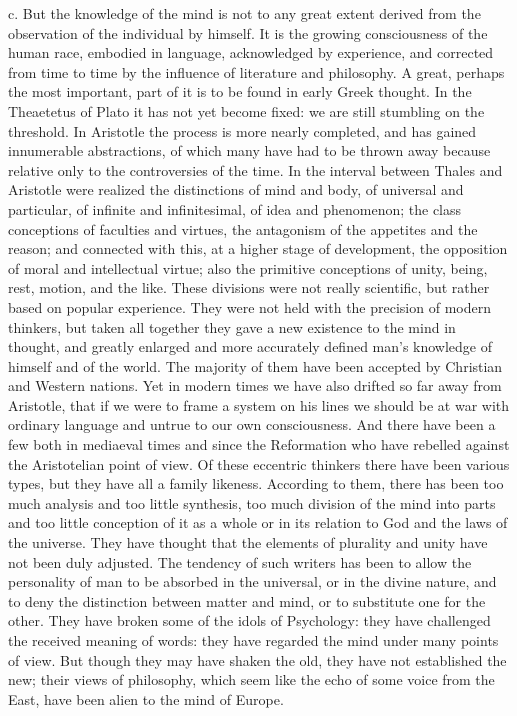 c. But the knowledge of the mind is not to any great extent derived
from the observation of the individual by himself. It is the growing
consciousness of the human race, embodied in language, acknowledged
by experience, and corrected from time to time by the influence of
literature and philosophy. A great, perhaps the most important, part of
it is to be found in early Greek thought. In the Theaetetus of Plato it
has not yet become fixed: we are still stumbling on the threshold.
In Aristotle the process is more nearly completed, and has gained
innumerable abstractions, of which many have had to be thrown away
because relative only to the controversies of the time. In the interval
between Thales and Aristotle were realized the distinctions of mind and
body, of universal and particular, of infinite and infinitesimal, of
idea and phenomenon; the class conceptions of faculties and virtues, the
antagonism of the appetites and the reason; and connected with this, at
a higher stage of development, the opposition of moral and intellectual
virtue; also the primitive conceptions of unity, being, rest, motion,
and the like. These divisions were not really scientific, but rather
based on popular experience. They were not held with the precision of
modern thinkers, but taken all together they gave a new existence to the
mind in thought, and greatly enlarged and more accurately defined man's
knowledge of himself and of the world. The majority of them have been
accepted by Christian and Western nations. Yet in modern times we have
also drifted so far away from Aristotle, that if we were to frame a
system on his lines we should be at war with ordinary language and
untrue to our own consciousness. And there have been a few both in
mediaeval times and since the Reformation who have rebelled against the
Aristotelian point of view. Of these eccentric thinkers there have been
various types, but they have all a family likeness. According to them,
there has been too much analysis and too little synthesis, too much
division of the mind into parts and too little conception of it as a
whole or in its relation to God and the laws of the universe. They have
thought that the elements of plurality and unity have not been duly
adjusted. The tendency of such writers has been to allow the personality
of man to be absorbed in the universal, or in the divine nature, and to
deny the distinction between matter and mind, or to substitute one for
the other. They have broken some of the idols of Psychology: they have
challenged the received meaning of words: they have regarded the mind
under many points of view. But though they may have shaken the old, they
have not established the new; their views of philosophy, which seem like
the echo of some voice from the East, have been alien to the mind of
Europe.

